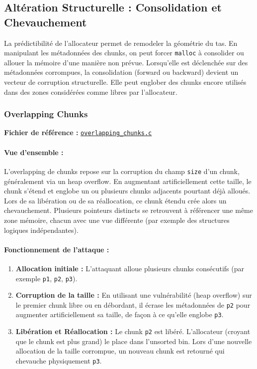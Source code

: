 \subsection{Altération Structurelle : Consolidation et Chevauchement}

La prédictibilité de l’allocateur permet de remodeler la géométrie du tas.
En manipulant les métadonnées des chunks, on peut forcer \texttt{malloc} à
consolider ou allouer la mémoire d’une manière non prévue. Lorsqu’elle est
déclenchée sur des métadonnées corrompues, la consolidation (forward ou
backward) devient un vecteur de corruption structurelle.
Elle peut englober des chunks encore utilisés dans des zones considérées comme libres par
l’allocateur.


\subsubsection{Overlapping Chunks}

\noindent\textbf{Fichier de référence :} \href{https://github.com/shellphish/how2heap/blob/master/glibc_2.41/overlapping_chunks.c}{\texttt{overlapping\_chunks.c}}

\paragraph{Vue d'ensemble :}
L’overlapping de chunks repose sur la corruption du champ \texttt{size} d’un chunk,
généralement via un heap overflow. En augmentant artificiellement cette taille,
le chunk s’étend et englobe un ou plusieurs chunks adjacents pourtant déjà alloués.
Lors de sa libération ou de sa réallocation, ce chunk étendu crée alors un
chevauchement.
Plusieurs pointeurs distincts se retrouvent à référencer une
même zone mémoire, chacun avec une vue différente (par exemple des structures
logiques indépendantes).

\paragraph{Fonctionnement de l'attaque :}
\begin{enumerate}
    \item \textbf{Allocation initiale :} L'attaquant alloue plusieurs chunks consécutifs (par exemple \texttt{p1}, \texttt{p2}, \texttt{p3}).
    \item \textbf{Corruption de la taille :} En utilisant une vulnérabilité (heap overflow) sur le premier chunk libre ou en débordant, il écrase les métadonnées de \texttt{p2} pour augmenter artificiellement sa taille, de façon à ce qu'elle englobe \texttt{p3}.
    \item \textbf{Libération et Réallocation :} Le chunk \texttt{p2} est libéré. L'allocateur (croyant que le chunk est plus grand) le place dans l'unsorted bin. Lors d'une nouvelle allocation de la taille corrompue, un nouveau chunk est retourné qui chevauche physiquement \texttt{p3}.
\end{enumerate}

